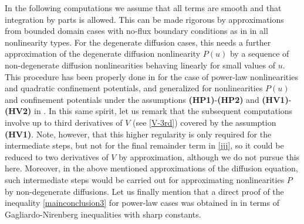 \documentclass[reqno]{amsart}
\begin{document}
In the following computations we assume that all terms are smooth and that integration by parts is allowed. This can be made rigorous by approximations from bounded domain cases with no-flux boundary conditions as in \cite{otto,CJMTU} in all nonlinearity types. For the degenerate diffusion cases, this needs a further approximation of the degenerate diffusion nonlinearity $P(u)$ by a sequence of non-degenerate diffusion nonlinearities behaving linearly for small values of $u$. This procedure has been properly done in \cite[Section 5]{otto} for the case of power-law nonlinearities and quadratic confinement potentials, and generalized for nonlinearities $P(u)$ and confinement potentials under the assumptions {\bf (HP1)}-{\bf (HP2)} and {\bf (HV1)}-{\bf (HV2)} in \cite[Section 3]{CJMTU}. In this same spirit, let us remark that the subsequent computations involve up to third derivatives of $V$ (see \eqref{V-3rd}) covered by the assumption {\bf (HV1)}. Note, however, that this higher regularity is only required for the intermediate steps, but not for the final remainder term in \eqref{jjj}, so it could be reduced to two derivatives of $V$ by approximation, although we do not pursue this here. Moreover, in the above mentioned approximations of the diffusion equation, such intermediate steps would be carried out for approximating nonlinearities $P$ by non-degenerate diffusions. Let us finally mention that a direct proof of the inequality \eqref{mainconclusion3} for power-law cases was obtained in \cite{DD02} in terms of Gagliardo-Nirenberg inequalities with sharp constants.
\end{document}
